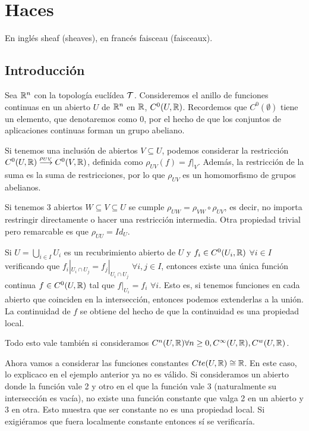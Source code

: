 \documentclass[GA.tex]{subfiles}
\begin{document}

\chapter{Haces}
En inglés sheaf (sheaves), en francés faisceau (faisceaux).

\section{Introducción}

\begin{ej}
Sea $\mathbb{R}^n$ con la topología euclídea $\mathcal{T}$. Consideremos el anillo de funciones continuas en un abierto $U$ de $\mathbb{R}^n$ en $\mathbb{R}$, $C^0(U,\mathbb{R})$. Recordemos que $C^0(\emptyset)$ tiene un elemento, que denotaremos como $0$, por el hecho de que los conjuntos de aplicaciones continuas forman un grupo abeliano. 

Si tenemos una inclusión de abiertos $V\subseteq U$, podemos considerar la restricción $C^0(U,\mathbb{R})\overset{\rho_{UV}}{\longrightarrow} C^0(V,\mathbb{R})$, definida como $\rho_{UV}(f)=f|_V$. Además, la restricción de la suma es la suma de restricciones, por lo que $\rho_{UV}$ es un homomorfismo de grupos abelianos. 

Si tenemos 3 abiertos $W\subseteq V\subseteq U$ se cumple $\rho_{UW}=\rho_{VW}\circ\rho_{UV}$, es decir, no importa restringir directamente o hacer una restricción intermedia. Otra propiedad trivial pero remarcable es que $\rho_{UU}=Id_U$. 


Si $U=\bigcup_{i\in I} U_i$ es un recubrimiento abierto de $U$ y $f_i\in C^0(U_i,\mathbb{R})$ $\forall i\in I$ verificando que $f_i|_{U_i\cap U_j}=f_j|_{U_i\cap U_j}$ $\forall i,j\in I$, entonces existe una única función continua $f\in C^0(U,\mathbb{R})$ tal que $f|_{U_i}=f_i$ $\forall i$. Esto es, si tenemos funciones en cada abierto que coinciden en la intersección, entonces podemos extenderlas a la unión. La continuidad de $f$ se obtiene del hecho de que la continuidad es una propiedad local. 

Todo esto vale también si consideramos $C^n(U,\mathbb{R})\forall n\geq 0, C^\infty(U,\mathbb{R}), C^w(U,\mathbb{R})$.
\end{ej}

\begin{ej}
Ahora vamos a considerar las funciones constantes $Cte(U,\mathbb{R})\cong \mathbb{R}$. En este caso, lo explicaco en el ejemplo anterior ya no es válido. Si consideramos un abierto donde la función vale 2 y otro en el que la función vale 3 (naturalmente su intersección es vacía), no existe una función constante que valga 2 en un abierto y 3 en otra. Esto muestra que ser constante no es una propiedad local. Si exigiéramos que fuera localmente constante entonces sí se verificaría.
\end{ej}
\end{document}
